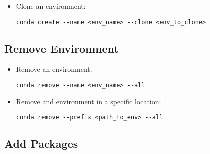 \begin{itemize}
    \item Clone an environment:
    \begin{verbatim}
conda create --name <env_name> --clone <env_to_clone>
    \end{verbatim}
\end{itemize}


\subsection{Remove Environment}

\begin{itemize}
    \item Remove an environment:
    \begin{verbatim}
conda remove --name <env_name> --all
    \end{verbatim}
    \item Remove and environment in a specific location:
    \begin{verbatim}
conda remove --prefix <path_to_env> --all
    \end{verbatim}
\end{itemize}


\subsection{Add Packages}


